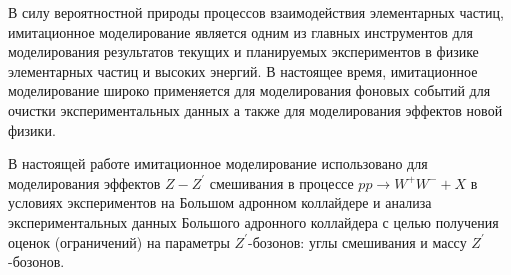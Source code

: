 В силу вероятностной природы процессов взаимодействия элементарных частиц, имитационное моделирование является одним из главных инструментов для моделирования результатов текущих и планируемых экспериментов в физике элементарных частиц и высоких энергий. В настоящее время, имитационное моделирование широко применяется для моделирования фоновых событий для очистки экспериментальных данных а также для моделирования эффектов новой физики.

В настоящей работе имитационное моделирование использовано для моделирования  эффектов $Z-{Z}^{\prime}$ смешивания в процессе $pp \rightarrow W^+W^- + X$ в условиях экспериментов на Большом адронном коллайдере и анализа экспериментальных данных Большого адронного коллайдера с целью получения оценок (ограничений) на параметры ${Z}^{\prime}$-бозонов: углы смешивания и массу ${Z}^{\prime}$-бозонов.